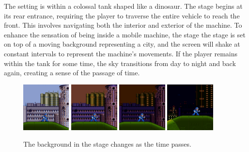 The setting is within a colossal tank shaped like a dinosaur. The stage begins at its rear entrance, requiring the player to traverse the entire vehicle to reach the front. This involves navigating both the interior and exterior of the machine. To enhance the sensation of being inside a mobile machine, the stage the stage is set on top of a moving background representing a city, and the screen will shake at constant intervals to represent the machine's movements. If the player remains within the tank for some time, the sky transitions from day to night and back again, creating a sense of the passage of time.
\begin{figure}[htp]
	\centering
	\includegraphics[height=2.5cm]{figures/X2/Wheel_gator/Gator_day.jpg}
	\includegraphics[height=2.5cm]{figures/X2/Wheel_gator/Gator_day_1.jpg}
	\includegraphics[height=2.5cm]{figures/X2/Wheel_gator/Gator_day_2.jpg}
	\includegraphics[height=2.5cm]{figures/X2/Wheel_gator/Gator_day_3.jpg}
	\caption{The background in the stage changes as the time passes.}
\end{figure}

